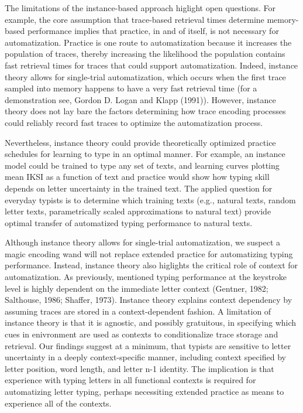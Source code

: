 \documentclass[floatsintext,man]{apa6}
\theoremstyle{definition}
\theoremstyle{definition}
\theoremstyle{definition}
\theoremstyle{remark}
\begin{document}
The limitations of the instance-based approach higlight open questions.
For example, the core assumption that trace-based retrieval times
determine memory-based performance implies that practice, in and of
itself, is not necessary for automatization. Practice is one route to
automatization because it increases the population of traces, thereby
increasing the likelihood the population contains fast retrieval times
for traces that could support automatization. Indeed, instance theory
allows for single-trial automatization, which occurs when the first
trace sampled into memory happens to have a very fast retrieval time
(for a demonstration see, Gordon D. Logan and Klapp (1991)). However,
instance theory does not lay bare the factors determining how trace
encoding processes could reliably record fast traces to optimize the
automatization process.

Nevertheless, instance theory could provide theoretically optimized
practice schedules for learning to type in an optimal manner. For
example, an instance model could be trained to type any set of texts,
and learning curves plotting mean IKSI as a function of text and
practice would show how typing skill depends on letter uncertainty in
the trained text. The applied question for everyday typists is to
determine which training texts (e.g., natural texts, random letter
texts, parametrically scaled approximations to natural text) provide
optimal transfer of automatized typing performance to natural texts.

Although instance theory allows for single-trial automatization, we
suspect a magic encoding wand will not replace extended practice for
automatizing typing performance. Instead, instance theory also higlights
the critical role of context for automatization. As previously,
mentioned typing performance at the keystroke level is highly dependent
on the immediate letter context (Gentner, 1982; Salthouse, 1986;
Shaffer, 1973). Instance theory explains context dependency by assuming
traces are stored in a context-dependent fashion. A limitation of
instance theory is that it is agnostic, and possibly gratuitous, in
specifying which cues in enivronment are used as contexts to
conditionalize trace storage and retrieval. Our findings suggest at a
minimum, that typists are sensitive to letter uncertainty in a deeply
context-specific manner, including context specified by letter position,
word length, and letter n-1 identity. The implication is that experience
with typing letters in all functional contexts is required for
automatizing letter typing, perhaps necessiting extended practice as
means to experience all of the contexts.
\end{document}
